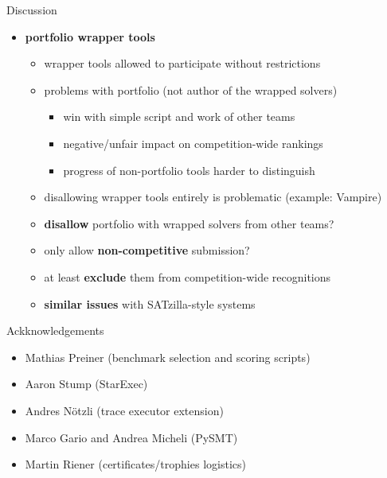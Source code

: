 \documentclass[10pt]{beamer}
\newcommand{\orangea}{\ensuremath{\textcolor{mLightBrown}{\longrightarrow}}\xspace}
\begin{document}
  \begin{frame}{Discussion}
    \begin{itemize}
      \item \textbf{portfolio wrapper tools}
        \begin{itemize}
          \item wrapper tools allowed to participate without restrictions
          \vspace{1ex}
          \item problems with portfolio
            (not author of the wrapped solvers)
            \begin{itemize}
              \item win with simple script and work of other teams
              \item negative/unfair impact on competition-wide rankings
              \item progress of non-portfolio tools harder to distinguish
            \end{itemize}
          \vspace{1ex}
          \item disallowing wrapper tools entirely is problematic (example: Vampire)
          \vspace{2ex}
          \setbeamertemplate{itemize items}{\orangea}
          \item \textbf{disallow} portfolio with wrapped solvers from other teams?
          \vspace{1ex}
          \item only allow \textbf{non-competitive} submission?
          \vspace{1ex}
          \item at least \textbf{exclude} them from competition-wide recognitions
          \vspace{1ex}
          \item \textbf{similar issues} with SATzilla-style systems
        \end{itemize}
    \end{itemize}
  \end{frame}

  \begin{frame}{Ackknowledgements}
    \begin{itemize}
      \item Mathias Preiner (benchmark selection and scoring scripts)
      \item Aaron Stump (StarExec)
      \item Andres N\"{o}tzli (trace executor extension)
      \item Marco Gario and Andrea Micheli (PySMT)
      \item Martin Riener (certificates/trophies logistics)
    \end{itemize}
  \end{frame}
\end{document}
